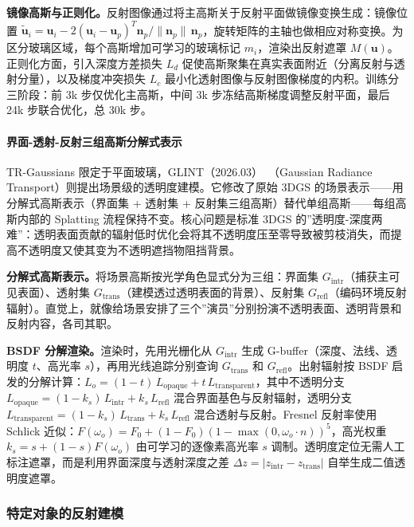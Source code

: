 \textbf{镜像高斯与正则化。}反射图像通过将主高斯关于反射平面做镜像变换生成：镜像位置 $\tilde{\mathbf{u}}_i = \mathbf{u}_i - 2(\mathbf{u}_i{-}\mathbf{u}_p)^T\mathbf{n}_p/\|\mathbf{n}_p\|\,\mathbf{n}_p$，旋转矩阵的主轴也做相应对称变换。为区分玻璃区域，每个高斯增加可学习的玻璃标记 $m_i$，渲染出反射遮罩 $M(\mathbf{u})$。正则化方面，引入深度方差损失 $L_d$ 促使高斯聚集在真实表面附近（分离反射与透射分量），以及梯度冲突损失 $L_c$ 最小化透射图像与反射图像梯度的内积。训练分三阶段：前 3k 步仅优化主高斯，中间 3k 步冻结高斯梯度调整反射平面，最后 24k 步联合优化，总 30k 步。

\paragraph{界面-透射-反射三组高斯分解式表示}

TR-Gaussians 限定于平面玻璃，GLINT（2026.03）~\cite{2603_26181}（Gaussian Radiance Transport）则提出场景级的透明度建模。它修改了原始 3DGS 的场景表示——用分解式高斯表示（界面集 + 透射集 + 反射集三组高斯）替代单组高斯——每组高斯内部的 Splatting 流程保持不变。核心问题是标准 3DGS 的”透明度-深度两难”：透明表面贡献的辐射低时优化会将其不透明度压至零导致被剪枝消失，而提高不透明度又使其变为不透明遮挡物阻挡背景。

\textbf{分解式高斯表示。}将场景高斯按光学角色显式分为三组：界面集 $G_{\text{intr}}$（捕获主可见表面）、透射集 $G_{\text{trans}}$（建模透过透明表面的背景）、反射集 $G_{\text{refl}}$（编码环境反射辐射）。直觉上，就像给场景安排了三个”演员”分别扮演不透明表面、透明背景和反射内容，各司其职。

\textbf{BSDF 分解渲染。}渲染时，先用光栅化从 $G_{\text{intr}}$ 生成 G-buffer（深度、法线、透明度 $t$、高光率 $s$），再用光线追踪分别查询 $G_{\text{trans}}$ 和 $G_{\text{refl}}$。出射辐射按 BSDF 启发的分解计算：$L_o = (1{-}t)\,L_{\text{opaque}} + t\,L_{\text{transparent}}$，其中不透明分支 $L_{\text{opaque}} = (1{-}k_s)\,L_{\text{intr}} + k_s\,L_{\text{refl}}$ 混合界面基色与反射辐射，透明分支 $L_{\text{transparent}} = (1{-}k_s)\,L_{\text{trans}} + k_s\,L_{\text{refl}}$ 混合透射与反射。Fresnel 反射率使用 Schlick 近似：$F(\omega_o) = F_0 + (1{-}F_0)(1{-}\max(0, \omega_o{\cdot}n))^5$，高光权重 $k_s = s + (1{-}s)F(\omega_o)$ 由可学习的逐像素高光率 $s$ 调制。透明度定位无需人工标注遮罩，而是利用界面深度与透射深度之差 $\Delta z = |z_{\text{intr}} - z_{\text{trans}}|$ 自举生成二值透明度遮罩。

\subsubsection{特定对象的反射建模}

